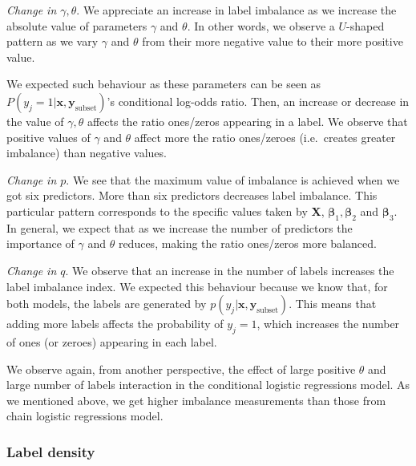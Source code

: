 \documentclass[review]{elsarticle}
\begin{document}
		\emph{Change in $\gamma,\theta$}. We appreciate an increase in label imbalance as we increase the absolute value of parameters $\gamma$ and $\theta$. In other words, we observe a $U$-shaped pattern as we vary $\gamma$ and $\theta$ from their more negative value to their more positive value. 
		
		We expected such behaviour as these parameters can be seen as $P(y_{j}=1|\mathbf{x},\mathbf{y}_{\mathrm{subset}})$'s conditional log-odds ratio. Then, an increase or decrease in the value of $\gamma, \theta$ affects the ratio ones/zeros appearing in a label. We observe that positive values of $\gamma$ and $\theta$ affect more the ratio ones/zeroes (i.e.~creates greater imbalance) than negative values.
		
		\emph{Change in $p$}. We see that the maximum value of imbalance is achieved when we got six predictors. More than six predictors decreases label imbalance. This particular pattern corresponds to the specific values taken by \textbf{X},  $\bm{\beta}_{1}, \bm{\beta}_{2}$ and $\bm{\beta}_{3}$. In general, we expect that as we increase the number of predictors the importance of $\gamma$ and $\theta$ reduces, making the ratio ones/zeros more balanced.
		
		\emph{Change in $q$}. We observe that an increase in the number of labels increases the label imbalance index. We expected this behaviour because we know that, for both models, the labels are generated by $p(y_{j}|\mathbf{x},\mathbf{y}_{\mathrm{subset}})$. This means that adding more labels affects the probability of $y_{j}=1$, which increases the number of ones (or zeroes) appearing in each label.
		
		We observe again, from another perspective, the effect of large positive $\theta$ and large number of labels interaction in the conditional logistic regressions model. As we mentioned above, we get higher imbalance measurements than those from chain logistic regressions model.
		
		\subsubsection{Label density}
		
\end{document}

